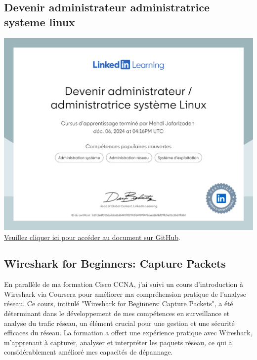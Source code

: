\documentclass{article}
\begin{document}
    \newpage
    \subsection{Devenir administrateur  administratrice systeme linux}
    \begin{center}
    \includegraphics[width=\textwidth,height=\textheight,keepaspectratio]{../Document/Certificats de Fin de Cours/Devenir administrateur administratrice systeme Linux/Devenir administrateur administratrice systeme Linux.pdf}
         \href{https://github.com/jafarizadeh/CV---lettre/tree/00df58c41988ba7488536512caee235bdb5d570d/Document/Certificats%20de%20Fin%20de%20Cours/Devenir%20administrateur%20%20administratrice%20systeme%20Linux}{Veuillez cliquer ici pour accéder au document sur GitHub}.
    
        \end{center}
    \newpage
    \subsection{Wireshark for Beginners: Capture Packets}

    En parallèle de ma formation Cisco CCNA, j'ai suivi un cours d'introduction à Wireshark via Coursera pour améliorer ma compréhension pratique de l'analyse réseau. Ce cours, intitulé "Wireshark for Beginners: Capture Packets", a été déterminant dans le développement de mes compétences en surveillance et analyse du trafic réseau, un élément crucial pour une gestion et une sécurité efficaces du réseau. La formation a offert une expérience pratique avec Wireshark, m'apprenant à capturer, analyser et interpréter les paquets réseau, ce qui a considérablement amélioré mes capacités de dépannage.
\end{document}
